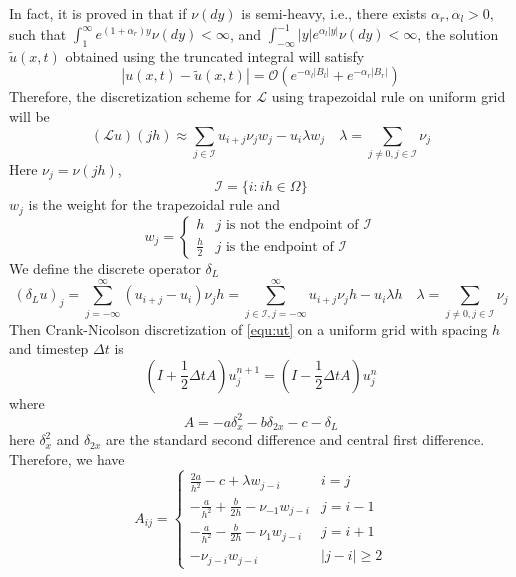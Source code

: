 \documentclass[3p,,preprint,12pt]{elsarticle}
\theoremstyle{definition}
\begin{document}
In fact, it is proved in \cite{cont2005finite} that if $\nu(dy)$ is semi-heavy, i.e., there exists $\alpha_r,\alpha_l>0$, such that $\int_1^\infty e^{(1+\alpha_r)y}\nu(dy)<\infty$, and $\int_{-\infty}^{-1}|y|e^{\alpha_l|y|}\nu(dy)<\infty$, the solution $\tilde u(x,t)$ obtained using the truncated integral will satisfy
\begin{equation}\label{equ:small}
	|u( x,t)-\tilde u(x,t)| =\mathcal{O}(e^{-\alpha_l|B_l|}+e^{-\alpha_r|B_r|})
\end{equation}
Therefore, the discretization scheme for $\mathcal{L}$ using trapezoidal rule on uniform grid will be
\begin{equation}
	(\mathcal{L} u)(jh) \approx   \sum_{j\in \mathcal{I}} u_{i+j}\nu_j w_j - u_i \lambda w_j\quad \lambda = \sum_{j\neq 0, j\in \mathcal{I}} \nu_j
\end{equation}
Here $\nu_j=\nu(jh)$, 
\begin{equation}
	\mathcal{I} = \{i: ih\in \Omega\}
\end{equation}
$w_j$ is the weight for the trapezoidal rule and 
\begin{equation}
	w_j = \begin{cases}
		h & j \mbox{ is not the endpoint of } \mathcal{I}\\
		\frac{h}{2} & j \mbox{ is the endpoint of } \mathcal{I}
	\end{cases}
\end{equation}
We define the discrete operator $\delta_L$
\begin{equation}\label{equ:dl}
	(\delta_L u)_j = \sum_{j=-\infty}^\infty (u_{i+j}-u_i)\nu_j h =  \sum_{j\in \mathcal{I}, j=-\infty}^\infty u_{i+j}\nu_j h - u_i \lambda h\quad \lambda = \sum_{j\neq 0, j\in \mathcal{I}} \nu_j
\end{equation}
Then Crank-Nicolson discretization of \cref{equ:ut} on a uniform grid with spacing $h$ and timestep $\Delta t$ is 
\begin{equation}\label{equ:scheme}
	(I+\frac{1}{2}\Delta tA)u_j^{n+1} = (I-\frac{1}{2}\Delta tA)u_j^n
\end{equation}
where 
\begin{equation}
	A = -a\delta_x^2 - b\delta_{2x} - c - \delta_L
\end{equation}
here $\delta_x^2$ and $\delta_{2x}$ are the standard second difference and central first difference. 
Therefore, we have
\begin{equation}\label{equ:Aij}
  {A_{ij}} = 
  \begin{cases}
  	{\frac{{2a}}{{{h^2}}} - c + \lambda w_{j-i}} & i=j\\
{ - \frac{a}{{{h^2}}} + \frac{b}{{2h}} - {\nu _{ - 1}w_{j-i}}} & j=i-1\\
{ - \frac{a}{{{h^2}}} - \frac{b}{{2h}} - {\nu _1}w_{j-i}} & j=i+1\\
{ - {\nu _{j - i}w_{j-i}}} & |j-i|\geq 2
  \end{cases}
\end{equation}
 
\end{document}

